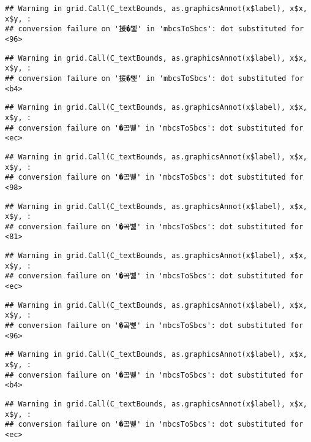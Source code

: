 \documentclass[
]{article}
\begin{document}
\begin{verbatim}
## Warning in grid.Call(C_textBounds, as.graphicsAnnot(x$label), x$x, x$y, :
## conversion failure on '援�뼱' in 'mbcsToSbcs': dot substituted for <96>
\end{verbatim}

\begin{verbatim}
## Warning in grid.Call(C_textBounds, as.graphicsAnnot(x$label), x$x, x$y, :
## conversion failure on '援�뼱' in 'mbcsToSbcs': dot substituted for <b4>
\end{verbatim}

\begin{verbatim}
## Warning in grid.Call(C_textBounds, as.graphicsAnnot(x$label), x$x, x$y, :
## conversion failure on '�곸뼱' in 'mbcsToSbcs': dot substituted for <ec>
\end{verbatim}

\begin{verbatim}
## Warning in grid.Call(C_textBounds, as.graphicsAnnot(x$label), x$x, x$y, :
## conversion failure on '�곸뼱' in 'mbcsToSbcs': dot substituted for <98>
\end{verbatim}

\begin{verbatim}
## Warning in grid.Call(C_textBounds, as.graphicsAnnot(x$label), x$x, x$y, :
## conversion failure on '�곸뼱' in 'mbcsToSbcs': dot substituted for <81>
\end{verbatim}

\begin{verbatim}
## Warning in grid.Call(C_textBounds, as.graphicsAnnot(x$label), x$x, x$y, :
## conversion failure on '�곸뼱' in 'mbcsToSbcs': dot substituted for <ec>
\end{verbatim}

\begin{verbatim}
## Warning in grid.Call(C_textBounds, as.graphicsAnnot(x$label), x$x, x$y, :
## conversion failure on '�곸뼱' in 'mbcsToSbcs': dot substituted for <96>
\end{verbatim}

\begin{verbatim}
## Warning in grid.Call(C_textBounds, as.graphicsAnnot(x$label), x$x, x$y, :
## conversion failure on '�곸뼱' in 'mbcsToSbcs': dot substituted for <b4>
\end{verbatim}

\begin{verbatim}
## Warning in grid.Call(C_textBounds, as.graphicsAnnot(x$label), x$x, x$y, :
## conversion failure on '�곸뼱' in 'mbcsToSbcs': dot substituted for <ec>
\end{verbatim}
\end{document}
